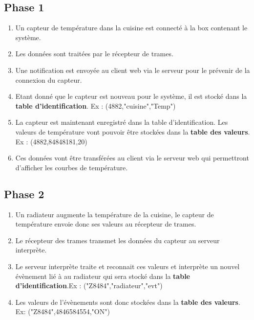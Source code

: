 \documentclass[10pt,a4paper]{article}
\begin{document}
\subsection{Phase 1}
\begin{enumerate}
\item Un capteur de température dans la cuisine est connecté à la box contenant le système.
\item Les données sont traitées par le récepteur de trames.
\item Une notification est envoyée au client web via le serveur pour le prévenir de la connexion du capteur.
\item Etant donné que le capteur est nouveau pour le système, il est stocké dans la \textbf{table d'identification}. Ex : (4882,"cuisine","Temp")
\item La capteur est maintenant enregistré dans la table d'identification. Les valeurs de température vont pouvoir être stockées dans la \textbf{table des valeurs}. Ex : (4882,84848181,20)
\item Ces données vont être transférées au client via le serveur web qui permettront d'afficher les courbes de température.
\end{enumerate}
\subsection{Phase 2}
\begin{enumerate}
\item Un radiateur augmente la température de la cuisine, le capteur de température envoie donc ses valeurs au récepteur de trames.
\item Le récepteur des trames transmet les données du capteur au serveur interprète.
\item Le serveur interprète traite et reconnait ces valeurs et interprète un nouvel évènement lié à au radiateur qui sera stocké dans la \textbf{table d'identification}.Ex : ("Z8484","radiateur","evt")
\item Les valeurs de l'évènements sont donc stockées dans la \textbf{table des valeurs}. Ex: ("Z8484",4846584554,"ON")
\end{enumerate}
\end{document}
